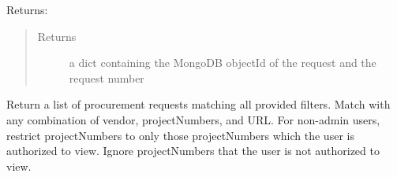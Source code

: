 \documentclass[letterpaper,10pt,english]{sphinxmanual}
\begin{document}
\begin{fulllineitems}
\begin{fulllineitems}
\begin{sphinxVerbatim}[commandchars=\\\{\}]
      
     \PYG{p}{[}
         
         
         
         
         
         
    \PYG{p}{]}
\end{sphinxVerbatim}

Returns:

\begin{sphinxVerbatim}[commandchars=\\\{\}]
     
     
\end{sphinxVerbatim}
\begin{quote}\begin{description}
\item[{Returns}] \leavevmode
a dict containing the MongoDB objectId of the request and the request number

\end{description}\end{quote}

\end{fulllineitems}


\begin{fulllineitems}
\label{\detokenize{apidoc/utdesign_procurement:utdesign_procurement.apigateway.ApiGateway.procurementStatuses}}
Return a list of procurement requests matching all provided filters.
Match with any combination of vendor, projectNumbers, and URL. For
non-admin users, restrict projectNumbers to only those projectNumbers
which the user is authorized to view. Ignore projectNumbers that the
user is not authorized to view.


\end{fulllineitems}
\end{fulllineitems}
\end{document}
